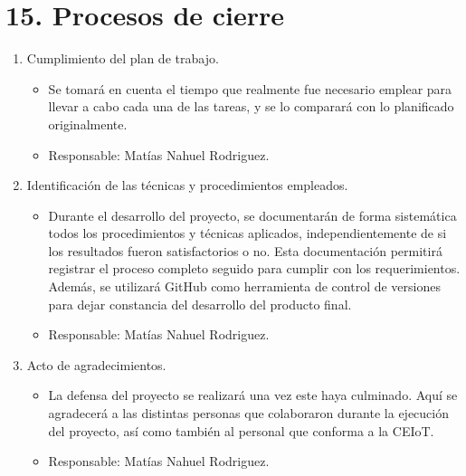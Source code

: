 \documentclass[
11pt, %
]{charter}
\begin{document}
\section{15. Procesos de cierre}    
\label{sec:cierre}
\begin{enumerate}
\item Cumplimiento del plan de trabajo.
	\begin{itemize}
	\item Se tomará en cuenta el tiempo que realmente fue necesario emplear para llevar a cabo cada una de las tareas, y se lo comparará con lo planificado originalmente.
	\item Responsable: Matías Nahuel Rodriguez.
	\end{itemize}
\item Identificación de las técnicas y procedimientos empleados.
	\begin{itemize}
	\item Durante el desarrollo del proyecto, se documentarán de forma sistemática todos los procedimientos y técnicas aplicados, independientemente de si los resultados fueron satisfactorios o no. Esta documentación permitirá registrar el proceso completo seguido para cumplir con los requerimientos. Además, se utilizará GitHub como herramienta de control de versiones para dejar constancia del desarrollo del producto final.
	\item Responsable: Matías Nahuel Rodriguez.
	\end{itemize}
\item Acto de agradecimientos.
	\begin{itemize}
	\item La defensa del proyecto se realizará una vez este haya culminado. Aquí se agradecerá a las distintas personas que colaboraron durante la ejecución del proyecto, así como también al personal que conforma a la CEIoT.
	\item Responsable: Matías Nahuel Rodriguez.
	\end{itemize}
\end{enumerate}
\end{document}
